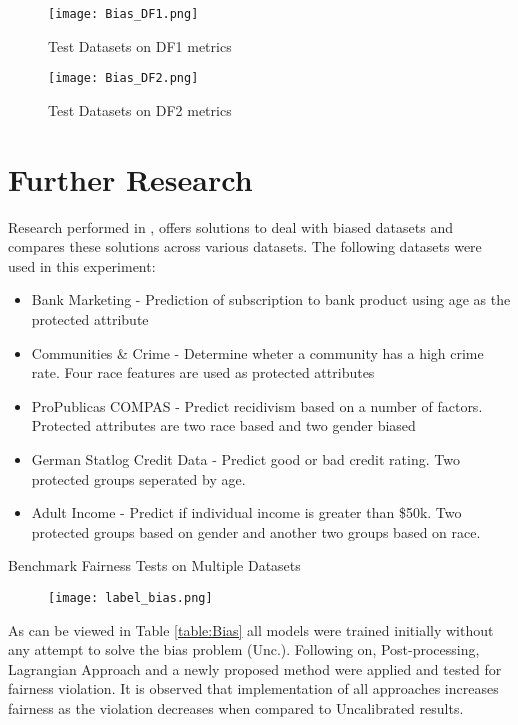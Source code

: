 \begin{figure}[H]
    \texttt{[image: Bias\_DF1.png]}
    \centering
    \caption{Test Datasets on DF1 metrics}
    \label{fig:DF1}
\end{figure}

\begin{figure}[H]
    \texttt{[image: Bias\_DF2.png]}
    \centering
    \caption{Test Datasets on DF2 metrics}
    \label{fig:DF2}
\end{figure}



\section{Further Research}
Research performed in \cite{Jiang}, offers solutions to deal with biased datasets and compares these solutions across various datasets.
The following datasets were used in this experiment:
\begin{itemize}
    \item Bank Marketing - Prediction of subscription to bank product using age as the protected attribute
    \item Communities \& Crime - Determine wheter a community has a high crime rate. Four race features are used as protected attributes
    \item ProPublicas COMPAS - Predict recidivism based on a number of factors. Protected attributes are two race based and two gender biased
    \item German Statlog Credit Data - Predict good or bad credit rating. Two protected groups seperated by age.
    \item Adult Income - Predict if individual income is greater than \$50k. Two protected groups based on gender and another two groups based on race.
\end{itemize}

\enlargethispage{\baselineskip}
\begin{table}[H]
    \bigskip
    \caption{Benchmark Fairness Tests on Multiple Datasets \cite{Jiang}}
    \begin{figure}[H]
        \texttt{[image: label\_bias.png]}
        \centering
    \end{figure}
    \label{table:fairness}
\end{table}

As can be viewed in Table \ref{table:Bias} all models were trained initially without any attempt to solve the bias problem (Unc.).
Following on, Post-processing, Lagrangian Approach and a newly proposed method were applied and tested for fairness violation.
It is observed that implementation of all approaches increases fairness as the violation decreases when compared to Uncalibrated results.

